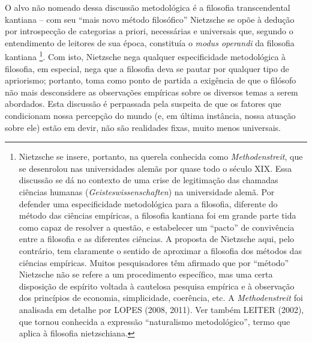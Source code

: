 \documentclass[
	12pt,				%
	openright,			%
	oneside,			%
	a4paper,			%
	english,			%
	french,				%
	spanish,			%
	brazil				%
	]{abntex2}
\begin{document}
	O alvo não nomeado dessa discussão metodológica é a filosofia transcendental kantiana – com seu “mais novo método filosófico” Nietzsche se opõe à dedução por introspecção de categorias a priori, necessárias e universais que, segundo o entendimento de leitores de sua época, constituía o \textit{modus operandi} da filosofia kantiana
\footnote{Nietzsche se insere, portanto, na querela conhecida como \textit{Methodenstreit}, que se desenrolou nas universidades alemãs por quase todo o século XIX. Essa discussão se dá no contexto de uma crise de legitimação das chamadas ciências humanas (\textit{Geisteswissenschaften}) na universidade alemã. Por defender uma especificidade metodológica para a filosofia, diferente do método das ciências empíricas, a filosofia kantiana foi em grande parte tida como capaz de resolver a questão, e estabelecer um “pacto” de convivência entre a filosofia e as diferentes ciências. A proposta de Nietzsche aqui, pelo contrário, tem claramente o sentido de aproximar a filosofia dos métodos das ciências empíricas. Muitos pesquisadores têm afirmado que por “método” Nietzsche não se refere a um procedimento específico, mas uma certa disposição de espírito voltada à cautelosa pesquisa empírica e à observação dos princípios de economia, simplicidade, coerência, etc. A \textit{Methodenstreit} foi analisada em detalhe por LOPES (2008, 2011). Ver também LEITER (2002), que tornou conhecida a expressão “naturalismo metodológico”, termo que aplica à filosofia nietzschiana.}. 
Com isto, Nietzsche nega qualquer especificidade metodológica à filosofia, em especial, nega que a filosofia deva se pautar por qualquer tipo de apriorismo; portanto, toma como ponto de partida a exigência de que o filósofo não mais desconsidere as observações empíricas sobre os diversos temas a serem abordados. Esta discussão é perpassada pela suspeita de que os fatores que condicionam nossa percepção do mundo (e, em última instância, nossa atuação sobre ele) estão em devir, não são realidades fixas, muito menos universais. 
\end{document}
